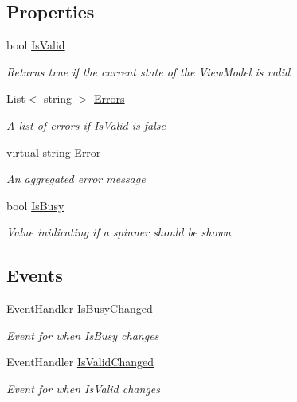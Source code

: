 \subsection*{Properties}
\begin{DoxyCompactItemize}
\item 
bool \hyperlink{class_field_service_1_1_view_models_1_1_view_model_base_a3eaef78dc011fb892e876d903adff375}{Is\+Valid}
\begin{DoxyCompactList}\small\item\em Returns true if the current state of the View\+Model is valid \end{DoxyCompactList}\item 
List$<$ string $>$ \hyperlink{class_field_service_1_1_view_models_1_1_view_model_base_acfdcc60579dad2ed4235829744454c5e}{Errors}
\begin{DoxyCompactList}\small\item\em A list of errors if Is\+Valid is false \end{DoxyCompactList}\item 
virtual string \hyperlink{class_field_service_1_1_view_models_1_1_view_model_base_a0749e92a5aa2aef6e204e0825bf6a6fb}{Error}
\begin{DoxyCompactList}\small\item\em An aggregated error message \end{DoxyCompactList}\item 
bool \hyperlink{class_field_service_1_1_view_models_1_1_view_model_base_ac79792fce62001ae8db6e7876ac0d837}{Is\+Busy}
\begin{DoxyCompactList}\small\item\em Value inidicating if a spinner should be shown \end{DoxyCompactList}\end{DoxyCompactItemize}
\subsection*{Events}
\begin{DoxyCompactItemize}
\item 
Event\+Handler \hyperlink{class_field_service_1_1_view_models_1_1_view_model_base_a358450ebfc5f259f34a81ee8184ad1c2}{Is\+Busy\+Changed}
\begin{DoxyCompactList}\small\item\em Event for when Is\+Busy changes \end{DoxyCompactList}\item 
Event\+Handler \hyperlink{class_field_service_1_1_view_models_1_1_view_model_base_af6a683e5a53bba62a459ce847680c1a8}{Is\+Valid\+Changed}
\begin{DoxyCompactList}\small\item\em Event for when Is\+Valid changes \end{DoxyCompactList}\end{DoxyCompactItemize}


